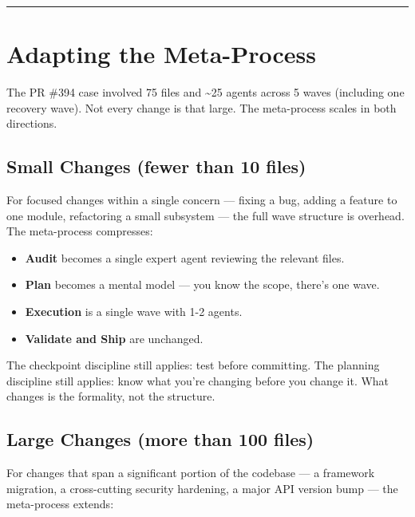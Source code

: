\documentclass[
  a4paper,
  DIV=11,
  numbers=noendperiod]{scrreprt}
\providecommand{\tightlist}{%
  \setlength{\itemsep}{0pt}\setlength{\parskip}{0pt}}
\begin{document}
\begin{center}\rule{0.5\linewidth}{0.5pt}\end{center}

\section{Adapting the Meta-Process}\label{adapting-the-meta-process}

The PR \#394 case involved 75 files and \textasciitilde25 agents across
5 waves (including one recovery wave). Not every change is that large.
The meta-process scales in both directions.

\subsection{Small Changes (fewer than 10
files)}\label{small-changes-fewer-than-10-files}

For focused changes within a single concern --- fixing a bug, adding a
feature to one module, refactoring a small subsystem --- the full wave
structure is overhead. The meta-process compresses:

\begin{itemize}
\tightlist
\item
  \textbf{Audit} becomes a single expert agent reviewing the relevant
  files.
\item
  \textbf{Plan} becomes a mental model --- you know the scope, there's
  one wave.
\item
  \textbf{Execution} is a single wave with 1-2 agents.
\item
  \textbf{Validate and Ship} are unchanged.
\end{itemize}

The checkpoint discipline still applies: test before committing. The
planning discipline still applies: know what you're changing before you
change it. What changes is the formality, not the structure.

\subsection{Large Changes (more than 100
files)}\label{large-changes-more-than-100-files}

For changes that span a significant portion of the codebase --- a
framework migration, a cross-cutting security hardening, a major API
version bump --- the meta-process extends:
\end{document}
